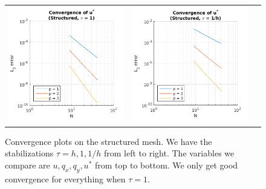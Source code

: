 \documentclass{article}
\begin{document}
\begin{figure}
\begin{tabular}{c c c}
\includegraphics[scale=0.5]{cspp_2.png} & 
\includegraphics[scale=0.5]{cspp_3.png}
\end{tabular}
\caption{Convergence plots on the structured mesh. We have the stabilizations $\tau = h, 1, 1/h$ from left to right. The variables we compare are $u, q_x, q_y, u^*$ from top to bottom. We only get good convergence for everything when $\tau = 1$.}
\label{fig:cs}
\end{figure}
\end{document}
